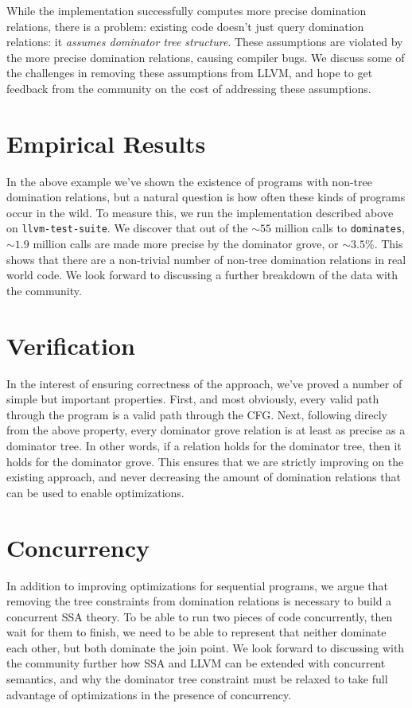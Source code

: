 \documentclass[a4paper,twocolumn]{article}
\begin{document}
While the implementation successfully computes more precise domination
relations, there is a problem: existing code doesn't just query domination
relations: it \emph{assumes dominator tree structure}. These assumptions are
violated by the more precise domination relations, causing compiler bugs. We
discuss some of the challenges in removing these assumptions from LLVM, and
hope to get feedback from the community on the cost of addressing these
assumptions.

\section*{Empirical Results}
In the above example we've shown the existence of programs with non-tree
domination relations, but a natural question is how often these kinds of
programs occur in the wild. To measure this, we run the implementation
described above on \texttt{llvm-test-suite}. We discover that out of the
$\sim55$ million calls to \texttt{dominates}, $\sim1.9$ million calls are made
more precise by the dominator grove, or $\sim3.5\%$. This shows that there are
a non-trivial number of non-tree domination relations in real world code. We
look forward to discussing a further breakdown of the data with the community.

\section*{Verification}
In the interest of ensuring correctness of the approach, we've proved a number
of simple but important properties. First, and most obviously, every valid path 
through the program is a valid path through the CFG. Next, following direcly
from the above property, every dominator grove relation is at least as precise 
as a dominator tree. In other words, if a relation holds for the dominator tree, 
then it holds for the dominator grove. This ensures that we are strictly
improving on the existing approach, and never decreasing the amount of
domination relations that can be used to enable optimizations.

\section*{Concurrency}
In addition to improving optimizations for sequential programs, we argue that 
removing the tree constraints from domination relations is necessary to build a
concurrent SSA theory. To be able to run two pieces of code concurrently, then
wait for them to finish, we need to be able to represent that neither dominate
each other, but both dominate the join point. We look forward to discussing
with the community further how SSA and LLVM can be extended with concurrent
semantics, and why the dominator tree constraint must be relaxed to take full
advantage of optimizations in the presence of concurrency.
\end{document}
